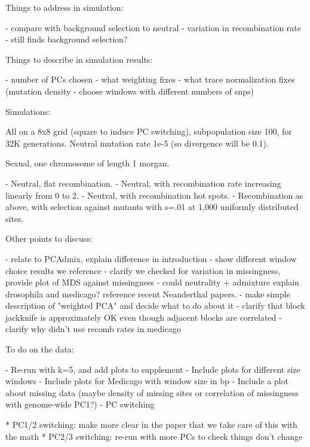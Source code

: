 Things to address in simulation:

- compare with background selection to neutral
- variation in recombination rate - still finds background selection?

Things to describe in simulation results:

- number of PCs chosen
- what weighting fixes
- what trace normalization fixes 
    (mutation density - choose windows with different numbers of snps)

Simulations:

All on a 8x8 grid (square to induce PC switching),
subpopulation size 100, for 32K generations.
Neutral mutation rate 1e-5 (so divergence will be 0.1).

Sexual, one chromosome of length 1 morgan.

- Neutral, flat recombination.
- Neutral, with recombination rate increasing linearly from 0 to 2.
- Neutral, with recombination hot spots.
- Recombination as above, with selection against mutants with s=.01 at 1,000 uniformly distributed sites.


Other points to discuss:

- relate to PCAdmix, explain difference in introduction
- show different window choice results we reference
- clarify we checked for variation in missingness, provide plot of MDS against missingness
- could neutrality + admixture explain drosophila and medicago? reference recent Neanderthal papers.
- make simple description of "weighted PCA" and decide what to do about it 
- clarify that block jackknife is approximately OK even though adjacent blocks are correlated
- clarify why didn't use recomb rates in medicago

To do on the data:

- Re-run with k=5, and add plots to supplement
- Include plots for different size windows
- Include plots for Medicago with window size in bp
- Include a plot about missing data 
    (maybe density of missing sites or correlation of missingness with genome-wide PC1?)
- PC switching


    * PC1/2 switching: make more clear in the paper that we take care of this with the math
    * PC2/3 switching: re-run with more PCs to check things don't change

